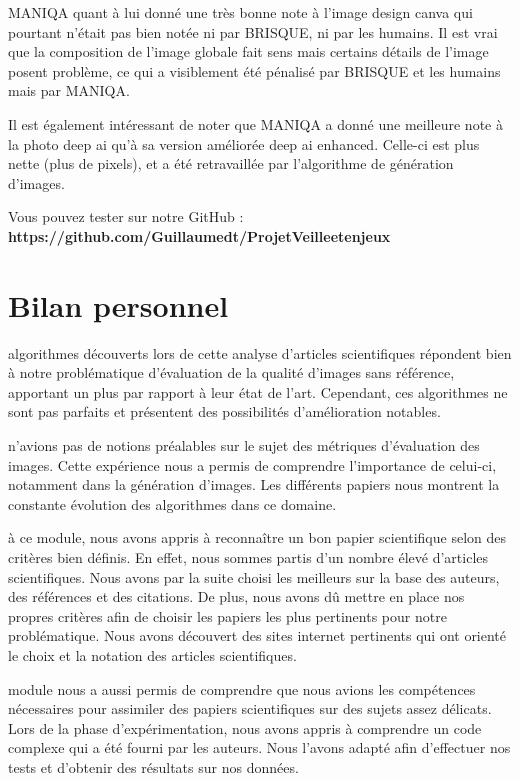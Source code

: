 \documentclass{ieeeaccess}
\begin{document}
MANIQA quant à lui donné une très bonne note à l’image design canva qui pourtant n’était pas bien notée ni par BRISQUE, ni par les humains. Il est vrai que la composition de l’image globale fait sens mais certains détails de l’image posent problème, ce qui a visiblement été pénalisé par BRISQUE et les humains mais par MANIQA. 

Il est également intéressant de noter que MANIQA a donné une meilleure note à la photo deep ai qu’à sa version améliorée deep ai enhanced. Celle-ci est plus nette (plus de pixels), et a été retravaillée par l’algorithme de génération d’images. 
\newline

Vous pouvez tester sur notre GitHub : \newline \textbf{https://github.com/Guillaumedt/Projet\textunderscore Veille\textunderscore et\textunderscore enjeux}

\section{Bilan personnel}

 algorithmes découverts lors de cette analyse d'articles scientifiques répondent bien à notre problématique d'évaluation de la qualité d'images sans référence, apportant un plus par rapport à leur état de l'art. Cependant, ces algorithmes ne sont pas parfaits et présentent des possibilités d'amélioration notables.

 n'avions pas de notions préalables sur le sujet des métriques d'évaluation des images. Cette expérience nous a permis de comprendre l'importance de celui-ci, notamment dans la génération d'images. Les différents papiers nous montrent la constante évolution des algorithmes dans ce domaine.

 à ce module, nous avons appris à reconnaître un bon papier scientifique selon des critères bien définis. En effet, nous sommes partis d'un nombre élevé d'articles scientifiques. Nous avons par la suite choisi les meilleurs sur la base des auteurs, des références et des citations. De plus, nous avons dû mettre en place nos propres critères afin de choisir les papiers les plus pertinents pour notre problématique. Nous avons découvert des sites internet pertinents qui ont orienté le choix et la notation des articles scientifiques.

 module nous a aussi permis de comprendre que nous avions les compétences nécessaires pour assimiler des papiers scientifiques sur des sujets assez délicats. Lors de la phase d'expérimentation, nous avons appris à comprendre un code complexe qui a été fourni par les auteurs. Nous l'avons adapté afin d'effectuer nos tests et d'obtenir des résultats sur nos données.
\end{document}
